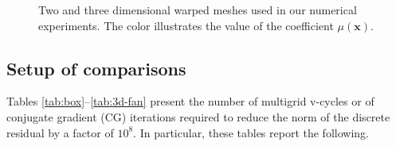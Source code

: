 \documentclass[smallcondensed,final]{svjour3}     %
\newcommand{\bs}[1]{\ensuremath{\boldsymbol #1}}
\begin{document}
\begin{figure}
	
	
	\caption{\label{fig:mesh} Two and three dimensional warped
          meshes used in our numerical experiments. The color
          illustrates the value of the coefficient $\mu(\bs x)$.}
\end{figure}


\subsection{Setup of comparisons}\label{subsec:measures}
Tables \ref{tab:box}--\ref{tab:3d-fan} present the number of multigrid
v-cycles or of conjugate gradient (CG) iterations required to reduce
the norm of the discrete residual by a factor of $10^8$. In
particular, these tables report the following.
\end{document}
